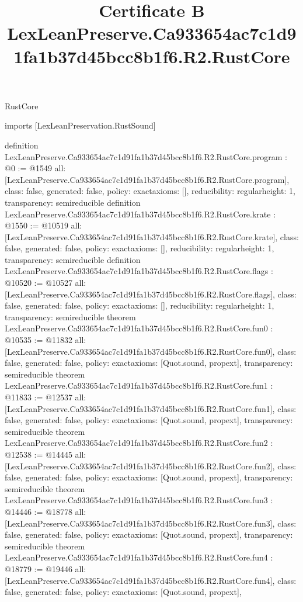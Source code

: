 \begin{lexlean}{RustCore}
\title{Certificate B LexLeanPreserve.Ca933654ac7c1d91fa1b37d45bcc8b1f6.R2.RustCore}
\begin{coremodule}
imports [LexLeanPreservation.RustSound]

definition LexLeanPreserve.Ca933654ac7c1d91fa1b37d45bcc8b1f6.R2.RustCore.program : @0 := @1549 {
  all: [LexLeanPreserve.Ca933654ac7c1d91fa1b37d45bcc8b1f6.R2.RustCore.program],
  class: false,
  generated: false,
  policy: exact{axioms: []},
  reducibility: regular{height: 1},
  transparency: semireducible
}
definition LexLeanPreserve.Ca933654ac7c1d91fa1b37d45bcc8b1f6.R2.RustCore.krate : @1550 := @10519 {
  all: [LexLeanPreserve.Ca933654ac7c1d91fa1b37d45bcc8b1f6.R2.RustCore.krate],
  class: false,
  generated: false,
  policy: exact{axioms: []},
  reducibility: regular{height: 1},
  transparency: semireducible
}
definition LexLeanPreserve.Ca933654ac7c1d91fa1b37d45bcc8b1f6.R2.RustCore.flags : @10520 := @10527 {
  all: [LexLeanPreserve.Ca933654ac7c1d91fa1b37d45bcc8b1f6.R2.RustCore.flags],
  class: false,
  generated: false,
  policy: exact{axioms: []},
  reducibility: regular{height: 1},
  transparency: semireducible
}
theorem LexLeanPreserve.Ca933654ac7c1d91fa1b37d45bcc8b1f6.R2.RustCore.fun0 : @10535 := @11832 {
  all: [LexLeanPreserve.Ca933654ac7c1d91fa1b37d45bcc8b1f6.R2.RustCore.fun0],
  class: false,
  generated: false,
  policy: exact{axioms: [Quot.sound, propext]},
  transparency: semireducible
}
theorem LexLeanPreserve.Ca933654ac7c1d91fa1b37d45bcc8b1f6.R2.RustCore.fun1 : @11833 := @12537 {
  all: [LexLeanPreserve.Ca933654ac7c1d91fa1b37d45bcc8b1f6.R2.RustCore.fun1],
  class: false,
  generated: false,
  policy: exact{axioms: [Quot.sound, propext]},
  transparency: semireducible
}
theorem LexLeanPreserve.Ca933654ac7c1d91fa1b37d45bcc8b1f6.R2.RustCore.fun2 : @12538 := @14445 {
  all: [LexLeanPreserve.Ca933654ac7c1d91fa1b37d45bcc8b1f6.R2.RustCore.fun2],
  class: false,
  generated: false,
  policy: exact{axioms: [Quot.sound, propext]},
  transparency: semireducible
}
theorem LexLeanPreserve.Ca933654ac7c1d91fa1b37d45bcc8b1f6.R2.RustCore.fun3 : @14446 := @18778 {
  all: [LexLeanPreserve.Ca933654ac7c1d91fa1b37d45bcc8b1f6.R2.RustCore.fun3],
  class: false,
  generated: false,
  policy: exact{axioms: [Quot.sound, propext]},
  transparency: semireducible
}
theorem LexLeanPreserve.Ca933654ac7c1d91fa1b37d45bcc8b1f6.R2.RustCore.fun4 : @18779 := @19446 {
  all: [LexLeanPreserve.Ca933654ac7c1d91fa1b37d45bcc8b1f6.R2.RustCore.fun4],
  class: false,
  generated: false,
  policy: exact{axioms: [Quot.sound, propext]},
}
\end{coremodule}
\end{lexlean}
